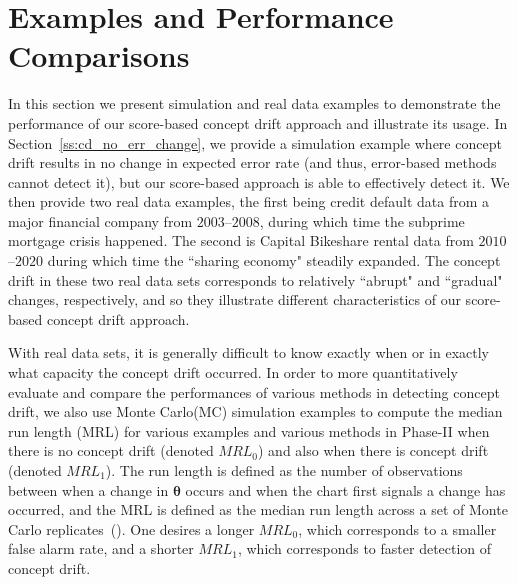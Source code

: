 \documentclass[twoside,11pt]{article}
\begin{document}
\section{Examples and Performance Comparisons}
\label{s:real_data}
In this section we present simulation and real data examples to demonstrate the performance of our score-based concept drift approach and illustrate its usage. In Section~\ref{ss:cd_no_err_change}, we provide a simulation example where concept drift results in no change in expected error rate (and thus, error-based methods cannot detect it), but our score-based approach is able to effectively detect it. We then provide two real data examples, the first being credit default data from a major financial company from $2003$--$2008$, during which time the subprime mortgage crisis happened. The second is Capital Bikeshare rental data from $2010$--$2020$ during which time the ``sharing economy" steadily expanded. The concept drift in these two real data sets corresponds to relatively ``abrupt" and ``gradual" changes, respectively, and so they illustrate different characteristics of our score-based concept drift approach. 

With real data sets, it is generally difficult to know exactly when or in exactly what capacity the concept drift occurred. In order to more quantitatively evaluate and compare the performances of various methods in detecting concept drift, we also use Monte Carlo(MC) simulation examples to compute the median run length (MRL) for various examples and various methods in Phase-II when there is no concept drift (denoted $MRL_0$) and also when there is concept drift (denoted $MRL_1$). The run length is defined as the number of observations between when a change in $\bm{\theta}$ occurs and when the chart first signals a change has occurred, and the MRL is defined as the median run length across a set of Monte Carlo replicates~(\cite{montgomery2007introduction}). One desires a longer $MRL_0$, which corresponds to a smaller false alarm rate, and a shorter $MRL_1$, which corresponds to faster detection of concept drift. 
\end{document}
